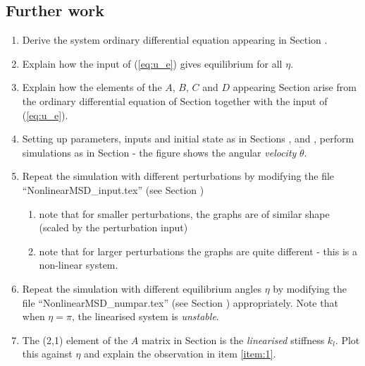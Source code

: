 \subsection{Further work}
\label{sec:further}
\begin{enumerate}
\item Derive the system ordinary differential equation appearing in
  Section .
\item Explain how the input of (\ref{eq:u_e}) gives equilibrium for
  all $\eta$.
\item Explain how the elements of the $A$, $B$, $C$ and $D$ appearing
  Section  arise from the ordinary
  differential equation of Section 
  together with the input of (\ref{eq:u_e}).
\item Setting up parameters, inputs and initial state as in Sections
  , 
  and , perform simulations as in
  Section  - the figure shows the
  angular \emph{velocity} $\dot{\theta}$.
\item Repeat the simulation with different perturbations by modifying
  the file ``NonlinearMSD\_input.tex'' (see Section
  )
  \begin{enumerate}
  \item note that for smaller perturbations, the graphs are of similar
    shape (scaled by the perturbation input)
  \item note that for larger perturbations the graphs are quite
    different - this is a non-linear system.
  \end{enumerate}
\item \label{item:1} Repeat the simulation with different equilibrium angles $\eta$ by modifying
  the file ``NonlinearMSD\_numpar.tex'' (see Section
  ) appropriately. Note that when
  $\eta=\pi$, the linearised system is \emph{unstable}.
\item The (2,1) element of the $A$ matrix in Section
   is the \emph{linearised} stiffness
  $k_l$. Plot this against $\eta$ and explain the observation in item
  \ref{item:1}.
\end{enumerate}


